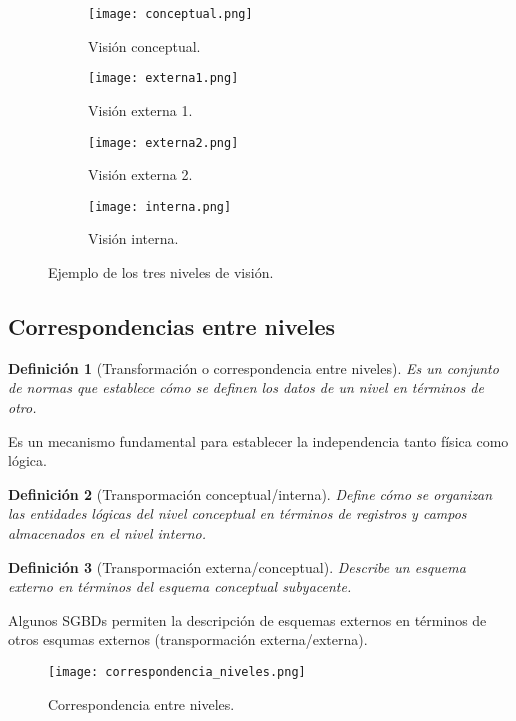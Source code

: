\documentclass[12pt,spanish]{article}
\newtheorem{definition}{Definición}
\numberwithin{definition}{subsection}
\begin{document}
\begin{figure}[H]
\centering
\begin{subfigure}[b]{0.75\textwidth}
\texttt{[image: conceptual.png]}
\caption{Visión conceptual.}
\end{subfigure}

	\begin{subfigure}[b]{0.4\textwidth}
		\texttt{[image: externa1.png]}
		\caption{Visión externa 1.}
	\end{subfigure}
\quad
	\begin{subfigure}[b]{0.45\textwidth}
		\texttt{[image: externa2.png]}
		\caption{Visión externa 2.}
	\end{subfigure}

\begin{subfigure}[b]{0.75\textwidth}
\texttt{[image: interna.png]}
\caption{Visión interna.}
\end{subfigure}
\caption{Ejemplo de los tres niveles de visión.}

\end{figure}


\subsection{Correspondencias entre niveles}

\begin{definition}[Transformación o correspondencia entre niveles]
Es un conjunto de normas que establece cómo se definen los datos de un nivel en términos de otro.
\end{definition}
Es un mecanismo fundamental para establecer la independencia tanto física como lógica.

\begin{definition}[Transpormación conceptual/interna]
Define cómo se organizan las entidades lógicas del nivel conceptual en términos de registros y campos almacenados en el nivel interno.
\end{definition}

\begin{definition}[Transpormación externa/conceptual]
Describe un esquema externo en términos del esquema conceptual subyacente.
\end{definition}

Algunos SGBDs permiten la descripción de esquemas externos en términos de otros esqumas externos (transpormación externa/externa).

\begin{figure}[H]
\centering
\texttt{[image: correspondencia\_niveles.png]}
\caption{Correspondencia entre niveles.}
\end{figure}
\end{document}
